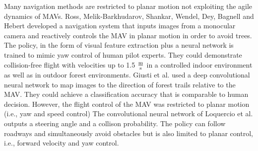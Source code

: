 Many navigation methods are restricted to planar motion not exploiting the agile dynamics of MAVs.
Ross, Melik-Barkhudarov, Shankar, Wendel, Dey, Bagnell and Hebert \cite{Ross2013}
developed a navigation system that inputs images from a monocular camera and
reactively controls the MAV in planar motion in order to avoid trees.
The policy, in the form of visual feature extraction plus a neural network is trained to mimic yaw control of human pilot experts.
They could demonstrate collision-free flight with velocities up to 1.5 $\frac{\text m}{\text s}$
in a controlled indoor environment as well as in outdoor forest environments.
Giusti et al. \cite{Giusti2016}  used a deep convolutional neural network to map images
to the direction of forest trails relative to the MAV.
They could achieve a classification accuracy that is comparable to human decision.
However, the flight control of the MAV was restricted to planar motion (i.e., yaw and speed control)
The convolutional neural network of Loquercio et al. \cite{Loquercio2018}
outputs a steering angle and a collison probability.
The policy can follow roadways and simultaneously avoid obstacles
but is also limited to planar control, i.e., forward velocity and yaw control.




%




